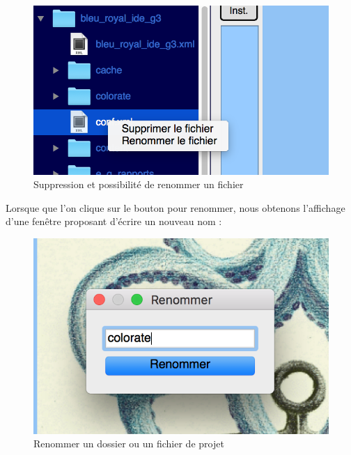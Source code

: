 \documentclass[a4paper,12pt]{article}
\begin{document}
\begin{figure}[h!]
			\begin{center}
				\includegraphics[scale=0.5]{images/imgs_projet/right_click_file.png}
				\caption{Suppression et possibilité de renommer un fichier}
			\end{center}
		\end{figure}

		\newpage
		
Lorsque que l'on clique sur le bouton pour renommer, nous obtenons l'affichage d'une fenêtre proposant d'écrire un nouveau nom :

\newpage

\begin{figure}[h!]
			\begin{center}
				\includegraphics[scale=0.5]{images/imgs_projet/rename.png}
				\caption{Renommer un dossier ou un fichier de projet}
			\end{center}
		\end{figure}
		
\end{document}

